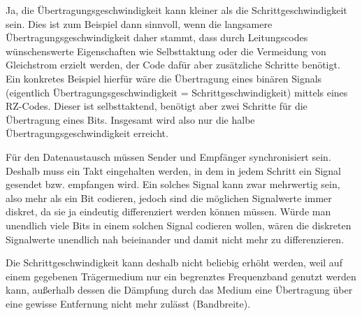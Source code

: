 \documentclass{../exercisesheet}
\begin{document}
\begin{exercise}{1.5}
	\begin{subexercise}
	Ja, die Übertragungsgeschwindigkeit kann kleiner als die Schrittgeschwindigkeit sein. Dies ist zum Beispiel dann sinnvoll, wenn die langsamere Übertragungsgeschwindigkeit daher stammt, dass durch Leitungscodes wünschenswerte Eigenschaften wie Selbsttaktung oder die Vermeidung von Gleichstrom erzielt werden, der Code dafür aber zusätzliche Schritte benötigt. Ein konkretes Beispiel hierfür wäre die Übertragung eines binären Signals (eigentlich Übertragungsgeschwindigkeit = Schrittgeschwindigkeit) mittels eines RZ-Codes. Dieser ist selbsttaktend, benötigt aber zwei Schritte für die Übertragung eines Bits. Insgesamt wird also nur die halbe Übertragungsgeschwindigkeit erreicht.
	\end{subexercise}

	\begin{subexercise}
	Für den Datenaustausch müssen Sender und Empfänger synchronisiert sein. Deshalb muss ein Takt eingehalten werden, in dem in jedem Schritt ein Signal gesendet bzw. empfangen wird. Ein solches Signal kann zwar mehrwertig sein, also mehr als ein Bit codieren, jedoch sind die möglichen Signalwerte immer diskret, da sie ja eindeutig differenziert werden können müssen. Würde man unendlich viele Bits in einem solchen Signal codieren wollen, wären die diskreten Signalwerte unendlich nah beieinander und damit nicht mehr zu differenzieren.
	\end{subexercise}

	\begin{subexercise} 
	Die Schrittgeschwindigkeit kann deshalb nicht beliebig erhöht werden, weil auf einem gegebenen Trägermedium nur ein begrenztes Frequenzband genutzt werden kann, außerhalb dessen die Dämpfung durch das Medium eine Übertragung über eine gewisse Entfernung nicht mehr zulässt (Bandbreite). 
	\end{subexercise}
\end{exercise}
\end{document}
